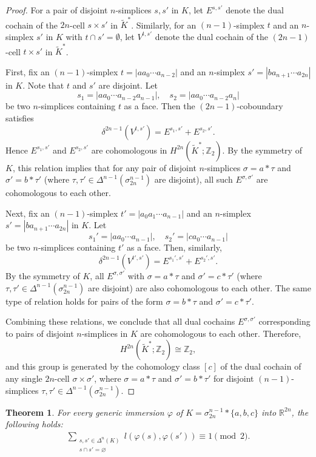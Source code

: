\documentclass[10pt,a4paper]{amsart}
\newtheorem{Theorem}{Theorem}[section]
\numberwithin{equation}{section}
\begin{document}
\begin{proof}
For a pair of disjoint $n$-simplices $s,s'$ in $K$, let $E^{s,s'}$ denote the dual cochain of the $2n$-cell $s \times s'$ in $\widetilde{K}^*$. Similarly, for an $(n-1)$-simplex $t$ and an $n$-simplex $s'$ in $K$ with $t \cap s' = \emptyset$, let $V^{t,s'}$ denote the dual cochain of the $(2n-1)$-cell $t \times s'$ in $\widetilde{K}^*$.

First, fix an $(n-1)$-simplex $t = |a a_0 \cdots a_{n-2}|$ and an $n$-simplex $s' = |b a_{n+1} \cdots a_{2n}|$ in $K$. Note that $t$ and $s'$ are disjoint. Let 
\[
s_1 = |a a_0 \cdots a_{n-2} a_{n-1}|, \quad s_2 = |a a_0 \cdots a_{n-2} a_n|
\]
be two $n$-simplices containing $t$ as a face. Then the $(2n-1)$-coboundary satisfies
\[
\delta^{2n-1}(V^{t,s'}) = E^{s_1,s'} + E^{s_2,s'}.
\]
Hence $E^{s_1,s'}$ and $E^{s_2,s'}$ are cohomologous in $H^{2n}(\widetilde{K}^*;\mathbb{Z}_2)$. By the symmetry of $K$, this relation implies that for any pair of disjoint $n$-simplices $\sigma = a*\tau$ and $\sigma' = b*\tau'$ (where $\tau,\tau'\in\varDelta^{n-1}(\sigma_{2n}^{n-1})$ are disjoint), all such $E^{\sigma,\sigma'}$ are cohomologous to each other.


Next, fix an $(n-1)$-simplex $t' = |a_0 a_1 \cdots a_{n-1}|$ and an $n$-simplex $s' = |b a_{n+1} \cdots a_{2n}|$ in $K$. Let 
\[
s_1' = |a a_0 \cdots a_{n-1}|, \quad s_2' = |c a_0 \cdots a_{n-1}|
\]
be two $n$-simplices containing $t'$ as a face. Then, similarly,
\[
\delta^{2n-1}(V^{t',s'}) = E^{s_1',s'} + E^{s_2',s'}.
\]
By the symmetry of $K$, all $E^{\sigma,\sigma'}$ with $\sigma = a*\tau$ and $\sigma' = c*\tau'$ (where $\tau,\tau'\in\varDelta^{n-1}(\sigma_{2n}^{n-1})$ are disjoint) are also cohomologous to each other. The same type of relation holds for pairs of the form $\sigma = b*\tau$ and $\sigma' = c*\tau'$.


Combining these relations, we conclude that all dual cochains $E^{\sigma,\sigma'}$ corresponding to pairs of disjoint $n$-simplices in $K$ are cohomologous to each other. Therefore,
\[
H^{2n}(\widetilde{K}^*;\mathbb{Z}_2) \cong \mathbb{Z}_2,
\]
and this group is generated by the cohomology class $[c]$ of the dual cochain of any single $2n$-cell $\sigma \times \sigma'$, where $\sigma = a*\tau$ and $\sigma' = b*\tau'$ for disjoint $(n-1)$-simplices $\tau,\tau'\in\varDelta^{n-1}(\sigma_{2n}^{n-1})$. 
\end{proof}



\begin{Theorem}\label{vko}
For every generic immersion $\varphi$ of $K = \sigma_{2n}^{n-1}*\{a,b,c\}$ into $\mathbb{R}^{2n}$, the following holds:
\begin{eqnarray*}
\sum_{\substack{s,s'\in\varDelta^{n}(K)\\ s\cap s'=\varnothing}} l(\varphi(s),\varphi(s')) \equiv 1 \pmod{2}.
\end{eqnarray*}
\end{Theorem}
\end{document}
